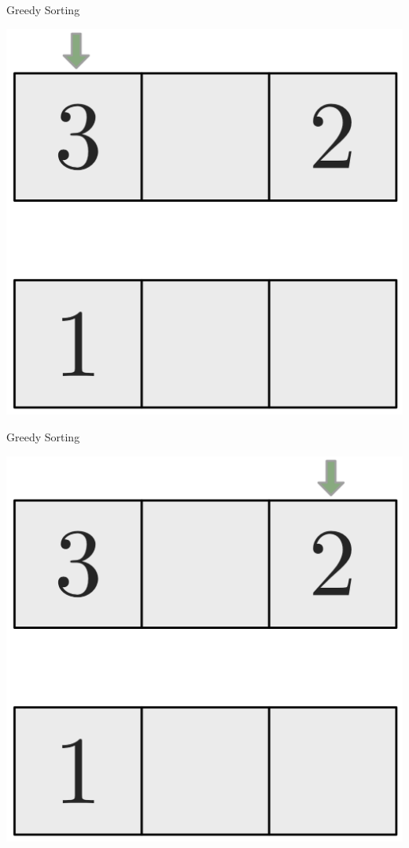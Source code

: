 \documentclass[10pt]{beamer}
\begin{document}
\begin{frame}[fragile]{Greedy Sorting}
    \begin{center}
        \includegraphics[height=.4\textheight]{Images/Bubblesort/Bubblesort_07}
    \end{center}
\end{frame}

\begin{frame}[fragile]{Greedy Sorting}
    \begin{center}
        \includegraphics[height=.4\textheight]{Images/Bubblesort/Bubblesort_08}
    \end{center}
\end{frame}
\end{document}
